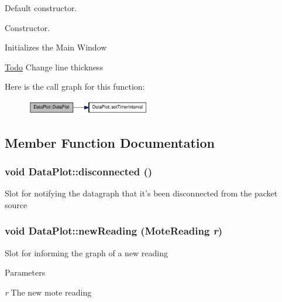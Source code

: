 Default constructor. 

Constructor.

Initializes the Main Window 

\begin{Desc}
\item[\hyperlink{todo__todo000001}{Todo}]Change line thickness \end{Desc}




Here is the call graph for this function:\nopagebreak
\begin{figure}[H]
\begin{center}
\leavevmode
\includegraphics[width=154pt]{classDataPlot_a1343acbd6095212532c4315d6e9f1711_cgraph}
\end{center}
\end{figure}




\subsection{Member Function Documentation}
\hypertarget{classDataPlot_a78920a414abdfa954fd34c662f39d09e}{
\subsubsection[{disconnected}]{\setlength{\rightskip}{0pt plus 5cm}void DataPlot::disconnected ()}}
\label{classDataPlot_a78920a414abdfa954fd34c662f39d09e}
Slot for notifying the datagraph that it's been disconnected from the packet source \hypertarget{classDataPlot_a36fe7e25f67a168d4f7dd2eaa2627003}{
\subsubsection[{newReading}]{\setlength{\rightskip}{0pt plus 5cm}void DataPlot::newReading ({\bf MoteReading} {\em r})}}
\label{classDataPlot_a36fe7e25f67a168d4f7dd2eaa2627003}
Slot for informing the graph of a new reading 
\begin{DoxyParams}{Parameters}
\item[{\em r}]The new mote reading \end{DoxyParams}



